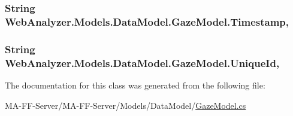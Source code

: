 \subsubsection[{Timestamp}]{\setlength{\rightskip}{0pt plus 5cm}String Web\+Analyzer.\+Models.\+Data\+Model.\+Gaze\+Model.\+Timestamp\hspace{0.3cm}{\ttfamily [get]}, {\ttfamily [set]}}\label{class_web_analyzer_1_1_models_1_1_data_model_1_1_gaze_model_af6b9cc989b7eefd89d4070d1683c8539}
\hypertarget{class_web_analyzer_1_1_models_1_1_data_model_1_1_gaze_model_a4fbd98b9986f70848075e65dec5fd8b4}{}
\subsubsection[{Unique\+Id}]{\setlength{\rightskip}{0pt plus 5cm}String Web\+Analyzer.\+Models.\+Data\+Model.\+Gaze\+Model.\+Unique\+Id\hspace{0.3cm}{\ttfamily [get]}, {\ttfamily [set]}}\label{class_web_analyzer_1_1_models_1_1_data_model_1_1_gaze_model_a4fbd98b9986f70848075e65dec5fd8b4}


The documentation for this class was generated from the following file\+:\begin{DoxyCompactItemize}
\item 
M\+A-\/\+F\+F-\/\+Server/\+M\+A-\/\+F\+F-\/\+Server/\+Models/\+Data\+Model/\hyperlink{_gaze_model_8cs}{Gaze\+Model.\+cs}\end{DoxyCompactItemize}

